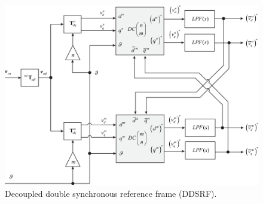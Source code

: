 \documentclass[11pt,a4paper,oneside]{book}
\numberwithin{equation}{section}
\theoremstyle{it}
\theoremstyle{definition}
\begin{document}
\begin{onehalfspace}
\begin{figure}[H]
	\centering
	\includegraphics[width = 450pt, angle = 0, 
	keepaspectratio]{figures/pll/ddsrf_pll_2.eps}
	\captionsetup{width=0.5\textwidth, font=small}	
	\caption{Decoupled double synchronous reference frame (DDSRF).}
	\label{ddsrf_pll_2}
\end{figure}

\end{onehalfspace}
\end{document}
